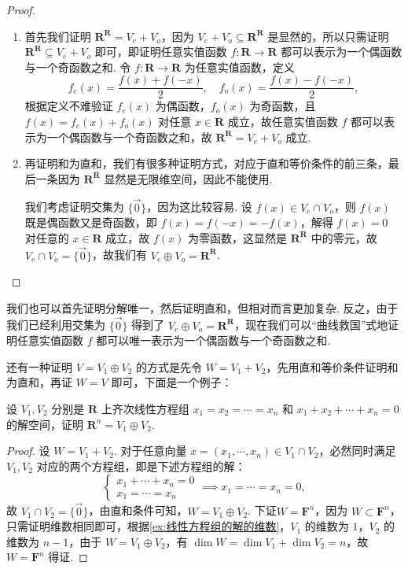 \begin{proof}
    \begin{enumerate}
        \item 首先我们证明 $\mathbf{R}^\mathbf{R} = V_e + V_o$，因为 $V_e + V_o \subseteq \mathbf{R}^\mathbf{R}$ 是显然的，所以只需证明 $\mathbf{R}^\mathbf{R} \subseteq V_e + V_o$ 即可，即证明任意实值函数 $f: \mathbf{R} \to \mathbf{R}$ 都可以表示为一个偶函数与一个奇函数之和. 令 $f: \mathbf{R} \to \mathbf{R}$ 为任意实值函数，定义
        \[ f_e(x) = \frac{f(x) + f(-x)}{2}, \quad f_o(x) = \frac{f(x) - f(-x)}{2}, \]
        根据定义不难验证 $f_e(x)$ 为偶函数，$f_o(x)$ 为奇函数，且 $f(x) = f_e(x) + f_o(x)$ 对任意 $x \in \mathbf{R}$ 成立，故任意实值函数 $f$ 都可以表示为一个偶函数与一个奇函数之和，故 $\mathbf{R}^\mathbf{R} = V_e + V_o$ 成立.
        \item 再证明和为直和，我们有很多种证明方式，对应于直和等价条件的前三条，最后一条因为 $\mathbf{R}^\mathbf{R}$ 显然是无限维空间，因此不能使用.

        我们考虑证明交集为 $\{\vec{0}\}$，因为这比较容易. 设 $f(x) \in V_e \cap V_o$，则 $f(x)$ 既是偶函数又是奇函数，即 $f(x) = f(-x) = -f(x)$，解得 $f(x) = 0$ 对任意的 $x \in \mathbf{R}$ 成立，故 $f(x)$ 为零函数，这显然是 $\mathbf{R}^\mathbf{R}$ 中的零元，故 $V_e \cap V_o = \{\vec{0}\}$，故我们有 $V_e \oplus V_o = \mathbf{R}^\mathbf{R}$.
    \end{enumerate}
\end{proof}

我们也可以首先证明分解唯一，然后证明直和，但相对而言更加复杂. 反之，由于我们已经利用交集为 $\{\vec{0}\}$ 得到了 $V_e \oplus V_o = \mathbf{R}^\mathbf{R}$，现在我们可以``曲线救国''式地证明任意实值函数 $f$ 都可以唯一表示为一个偶函数与一个奇函数之和.

还有一种证明 $V = V_1 \oplus V_2$ 的方式是先令 $W = V_1 + V_2$，先用直和等价条件证明和为直和，再证 $W = V$ 即可，下面是一个例子：
\begin{example}{}{}
    设 $V_1, V_2$ 分别是 $\mathbf{R}$ 上齐次线性方程组 $x_1 = x_2 = \cdots = x_n$ 和 $x_1 + x_2 + \cdots + x_n = 0$ 的解空间，证明 $\mathbf{R}^n = V_1 \oplus V_2$.
\end{example}

\begin{proof}
    设 $W = V_1 + V_2$. 对于任意向量 $x = (x_1,\cdots,x_n) \in V_1 \cap V_2$，必然同时满足 $V_1, V_2$ 对应的两个方程组，即是下述方程组的解：
    \[\begin{cases}
            x_1 + \cdots + x_n = 0 \\
            x_1= \cdots = x_n
        \end{cases} \implies x_1 = \cdots = x_n = 0,\]
    故 $V_1 \cap V_2 = \{\vec{0}\}$，由直和条件可知，$W = V_1 \oplus V_2$. 下证$W = \mathbf{F}^n$，因为 $W \subset \mathbf{F}^n$，只需证明维数相同即可，根据\autoref{ex:线性方程组的解的维数}，$V_1$ 的维数为 $1$，$V_2$ 的维数为 $n - 1$，由于 $W = V_1 \oplus V_2$，有 $\dim W = \dim V_1 + \dim V_2 = n$，故 $W = \mathbf{F}^n$ 得证.
\end{proof}

